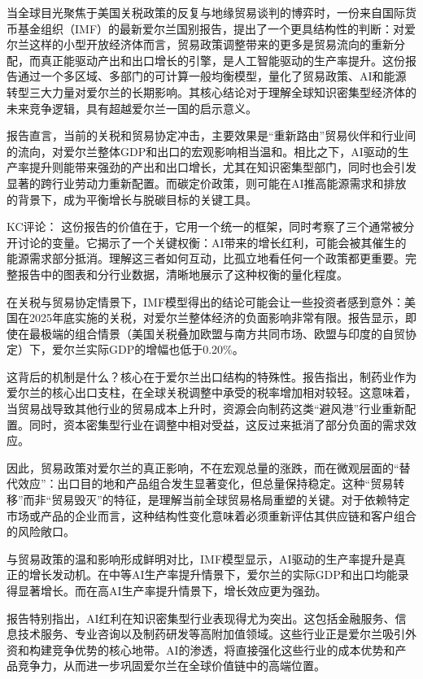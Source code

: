 \documentclass[11pt]{ctexart}
\begin{document}
当全球目光聚焦于美国关税政策的反复与地缘贸易谈判的博弈时，一份来自国际货币基金组织（IMF）的最新爱尔兰国别报告，提出了一个更具结构性的判断：对爱尔兰这样的小型开放经济体而言，贸易政策调整带来的更多是贸易流向的重新分配，而真正能驱动产出和出口增长的引擎，是人工智能驱动的生产率提升。这份报告通过一个多区域、多部门的可计算一般均衡模型，量化了贸易政策、AI和能源转型三大力量对爱尔兰的长期影响。其核心结论对于理解全球知识密集型经济体的未来竞争逻辑，具有超越爱尔兰一国的启示意义。

报告直言，当前的关税和贸易协定冲击，主要效果是“重新路由”贸易伙伴和行业间的流向，对爱尔兰整体GDP和出口的宏观影响相当温和。相比之下，AI驱动的生产率提升则能带来强劲的产出和出口增长，尤其在知识密集型部门，同时也会引发显著的跨行业劳动力重新配置。而碳定价政策，则可能在AI推高能源需求和排放的背景下，成为平衡增长与脱碳目标的关键工具。

KC评论： 这份报告的价值在于，它用一个统一的框架，同时考察了三个通常被分开讨论的变量。它揭示了一个关键权衡：AI带来的增长红利，可能会被其催生的能源需求部分抵消。理解这三者如何互动，比孤立地看任何一个政策都更重要。完整报告中的图表和分行业数据，清晰地展示了这种权衡的量化程度。

在关税与贸易协定情景下，IMF模型得出的结论可能会让一些投资者感到意外：美国在2025年底实施的关税，对爱尔兰整体经济的负面影响非常有限。报告显示，即使在最极端的组合情景（美国关税叠加欧盟与南方共同市场、欧盟与印度的自贸协定）下，爱尔兰实际GDP的增幅也低于0.20\%。

这背后的机制是什么？核心在于爱尔兰出口结构的特殊性。报告指出，制药业作为爱尔兰的核心出口支柱，在全球关税调整中承受的税率增加相对较轻。这意味着，当贸易战导致其他行业的贸易成本上升时，资源会向制药这类“避风港”行业重新配置。同时，资本密集型行业在调整中相对受益，这反过来抵消了部分负面的需求效应。

因此，贸易政策对爱尔兰的真正影响，不在宏观总量的涨跌，而在微观层面的“替代效应”：出口目的地和产品组合发生显著变化，但总量保持稳定。这种“贸易转移”而非“贸易毁灭”的特征，是理解当前全球贸易格局重塑的关键。对于依赖特定市场或产品的企业而言，这种结构性变化意味着必须重新评估其供应链和客户组合的风险敞口。

与贸易政策的温和影响形成鲜明对比，IMF模型显示，AI驱动的生产率提升是真正的增长发动机。在中等AI生产率提升情景下，爱尔兰的实际GDP和出口均能录得显著增长。而在高AI生产率提升情景下，增长效应更为强劲。

报告特别指出，AI红利在知识密集型行业表现得尤为突出。这包括金融服务、信息技术服务、专业咨询以及制药研发等高附加值领域。这些行业正是爱尔兰吸引外资和构建竞争优势的核心地带。AI的渗透，将直接强化这些行业的成本优势和产品竞争力，从而进一步巩固爱尔兰在全球价值链中的高端位置。
\end{document}
